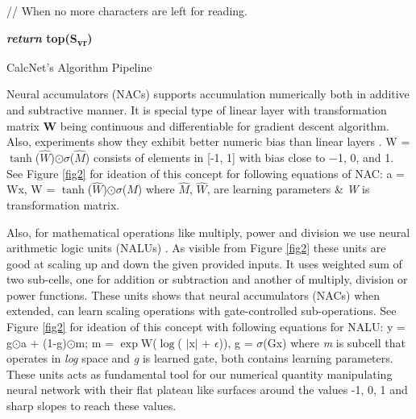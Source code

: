 \documentclass[conference]{IEEEtran}
\begin{document}
\begin{algorithm}
{{{      }
  }

 }
 // When no more characters are left for reading. \\
	
  \textbf{\textit{return }top(S\textsubscript{vr})}  
  
 \caption{CalcNet's Algorithm Pipeline}
\end{algorithm}

Neural accumulators (NACs) \cite{b5} supports accumulation numerically both in additive and subtractive manner. It is special type of linear layer with transformation matrix \textbf{W} being continuous and differentiable for gradient descent algorithm. Also, experiments show they exhibit better numeric bias than linear layers \cite{b5}. W = $\tanh$($\hat{W}$)$\odot$$\sigma$($\hat{M}$)  consists of elements in [-1, 1] with bias close to  −1, 0, and 1. See Figure \ref{fig2} for ideation of this concept for following equations of NAC:  a = Wx, W = $\tanh$($\hat{W}$)$\odot$$\sigma$($\hat{M}$) where \textit{$\hat{M}$}, \textit{$\hat{W}$}, are learning parameters \& \textit{W} is transformation matrix.

Also, for mathematical operations like multiply, power and division we use neural arithmetic logic units (NALUs) \cite{b5}. As visible from Figure \ref{fig2} these units are good at scaling up and down the given provided inputs. It uses weighted sum of two sub-cells, one for addition or subtraction and another of multiply, division or power functions. These units shows that neural accumulators (NACs) when extended, can learn scaling operations with gate-controlled sub-operations. See Figure \ref{fig2} for ideation of this concept with following equations for NALU: y = g$\odot$a + (1-g)$\odot$m; m = $\exp$W($\log$( $\mid$x$\mid$ + $\epsilon$)), g = $\sigma$(Gx) where \textit{m} is subcell that operates in \textit{log} space and \textit{g} is learned gate, both contains learning parameters. These units acts as fundamental tool for our numerical quantity manipulating neural network with their flat plateau like surfaces around the values -1, 0, 1 and sharp slopes to reach these values.
\end{document}

